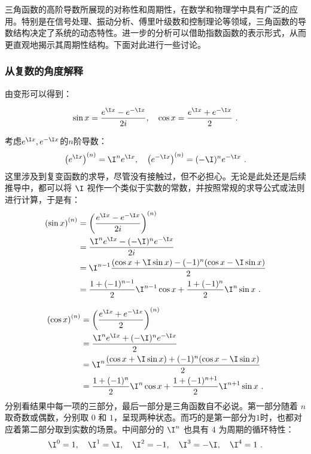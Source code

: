 三角函数的高阶导数所展现的对称性和周期性，在数学和物理学中具有广泛的应用。特别是在信号处理、振动分析、傅里叶级数和控制理论等领域，三角函数的导数结构决定了系统的动态特性。进一步的分析可以借助指数函数的表示形式，从而更直观地揭示其周期性结构。下面对此进行一些讨论。

\subsubsection{从复数的角度解释}

由变形可以得到：

\begin{equation}
\sin x = \frac{e^{\I x} - e^{-\I x}}{2i}, \quad \cos x = \frac{e^{\I x} + e^{-\I x}}{2}~.
\end{equation}

考虑$e^{\I x},e^{-\I x}$的$n$阶导数：
\begin{equation}
\left(e^{\I x}\right)^{(n)} = \I^n e^{\I x},\quad\left(e^{-\I x}\right)^{(n)} = (-\I)^n e^{-\I x}~.
\end{equation}
这里涉及到复变函数的求导，尽管没有接触过，但不必担心。无论是此处还是后续推导中，都可以将 $\I$ 视作一个类似于实数的常数，并按照常规的求导公式或法则进行计算，于是有：
\begin{equation}
\begin{split}
\left( \sin x \right)^{(n)} &= \left( \frac{e^{\I x} - e^{-\I x}}{2i} \right)^{(n)}\\
&=\frac{\I^n e^{\I x} - (-\I)^n e^{-\I x}}{2i}\\
&=\I^{n-1} \frac{(\cos x+\I\sin x) - (-1)^{n}(\cos x-\I\sin x )}{2}\\
&=\frac{1+(-1)^{n-1}}{2}\I^{n-1} \cos x+\frac{1+(-1)^{n}}{2}\I^{n} \sin x~.
\end{split}
\end{equation}

\begin{equation}
\begin{split}
\left( \cos x \right)^{(n)} &= \left( \frac{e^{\I x} + e^{-\I x}}{2} \right)^{(n)}\\
&=\frac{\I^n e^{\I x} + (-\I)^n e^{-\I x}}{2}\\
&=\I^{n} \frac{(\cos x+\I\sin x) + (-1)^{n}(\cos x-\I\sin x )}{2}\\
&=\frac{1+(-1)^{n}}{2}\I^{n} \cos x+\frac{1+(-1)^{n+1}}{2}\I^{n+1} \sin x~.
\end{split}
\end{equation}
分别看结果中每一项的三部分，最后一部分是三角函数自不必说。第一部分随着 $n$ 取奇数或偶数，分别取 $0$ 和 $1$，呈现两种状态。而巧的是第一部分为$1$时，也都对应着第二部分取到实数的场景。中间部分的 $\I^n$ 也具有 $4$ 为周期的循环特性：
\begin{equation}
\I^0 = 1, \quad \I^1 = \I, \quad \I^2 = -1, \quad \I^3 = -\I, \quad \I^4 = 1~.
\end{equation}

